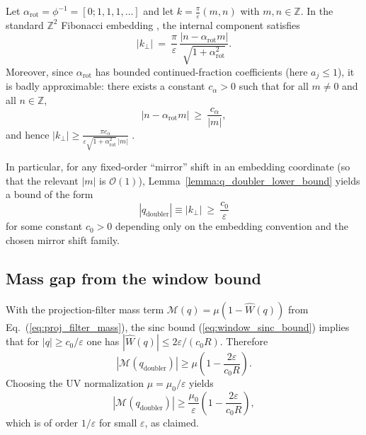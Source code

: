\begin{lemma}
\label{lemma:q_doubler_lower_bound}
Let $\alpha_{\mathrm{rot}}=\phi^{-1}=[0;1,1,1,\dots]$ and let $k=\frac{\pi}{\varepsilon}(m,n)$ with $m,n\in\mathbb{Z}$. In the standard $\mathbb{Z}^2$ Fibonacci embedding \cite{Senechal1995,BaakeGrimm2013AperiodicOrder}, the internal component satisfies
\begin{equation}
    |k_\perp|\ =\ \frac{\pi}{\varepsilon}\,\frac{|n-\alpha_{\mathrm{rot}}m|}{\sqrt{1+\alpha_{\mathrm{rot}}^2}}.
\end{equation}
Moreover, since $\alpha_{\mathrm{rot}}$ has bounded continued-fraction coefficients (here $a_j\le 1$), it is badly approximable: there exists a constant $c_{\alpha}>0$ such that for all $m\neq 0$ and all $n\in\mathbb{Z}$,
\begin{equation}
    |n-\alpha_{\mathrm{rot}}m|\ \ge\ \frac{c_{\alpha}}{|m|},
\end{equation}
and hence $|k_\perp|\ge \frac{\pi c_{\alpha}}{\varepsilon\sqrt{1+\alpha_{\mathrm{rot}}^2}\,|m|}$ \cite{Cassels1957Diophantine}.
\end{lemma}

\noindent
In particular, for any fixed-order ``mirror'' shift in an embedding coordinate (so that the relevant $|m|$ is $\mathcal{O}(1)$), Lemma~\ref{lemma:q_doubler_lower_bound} yields a bound of the form
\begin{equation}
    |q_{\mathrm{doubler}}|\equiv |k_\perp|\ \ge\ \frac{c_0}{\varepsilon}
\end{equation}
for some constant $c_0>0$ depending only on the embedding convention and the chosen mirror shift family.\par

\subsection{Mass gap from the window bound}
With the projection-filter mass term $\mathcal{M}(q)=\mu(1-\widehat{W}(q))$ from Eq.~(\ref{eq:proj_filter_mass}), the sinc bound (\ref{eq:window_sinc_bound}) implies that for $|q|\ge c_0/\varepsilon$ one has $|\widehat{W}(q)|\le 2\varepsilon/(c_0R)$. Therefore
\begin{equation}
    |\mathcal{M}(q_{\mathrm{doubler}})| \ge \mu\left(1-\frac{2\varepsilon}{c_0R}\right).
\end{equation}
Choosing the UV normalization $\mu=\mu_0/\varepsilon$ yields
\begin{equation}
    |\mathcal{M}(q_{\mathrm{doubler}})| \ge \frac{\mu_0}{\varepsilon}\left(1-\frac{2\varepsilon}{c_0R}\right),
\end{equation}
which is of order $1/\varepsilon$ for small $\varepsilon$, as claimed.\par

